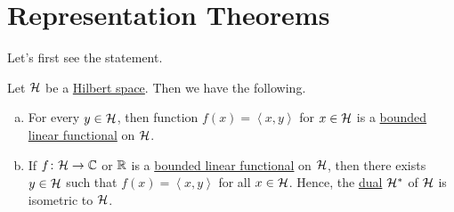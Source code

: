 \section{Representation Theorems}

Let's first see the statement.

\begin{theorem}\label{thm:Riesz-representation}
	Let \(\mathcal{\MakeUppercase{h}} \) be a \hyperref[def:Hilbert-space]{Hilbert space}. Then we have the following.
	\begin{enumerate}[(a)]
		\item For every \(y\in \mathcal{\MakeUppercase{h}} \), then function \(f(x) = \left\langle x, y \right\rangle \) for \(x\in \mathcal{\MakeUppercase{h}} \) is a \hyperref[def:bounded-linear-functional]{bounded linear functional} on \(\mathcal{\MakeUppercase{h}} \).
		\item If \(f\colon \mathcal{\MakeUppercase{h}} \to \mathbb{\MakeUppercase{c}} \) or \(\mathbb{\MakeUppercase{r}} \) is a \hyperref[def:bounded-linear-functional]{bounded linear functional} on \(\mathcal{\MakeUppercase{h}} \), then there exists \(y\in \mathcal{\MakeUppercase{h}} \) such that \(f(x) = \left\langle x,y \right\rangle \) for all \(x\in \mathcal{\MakeUppercase{h}} \). Hence, the \hyperref[def:dual-space]{dual} \(\mathcal{\MakeUppercase{h}} ^{\ast} \) of \(\mathcal{\MakeUppercase{h}} \) is isometric to \(\mathcal{\MakeUppercase{h}} \).
	\end{enumerate}
\end{theorem}
